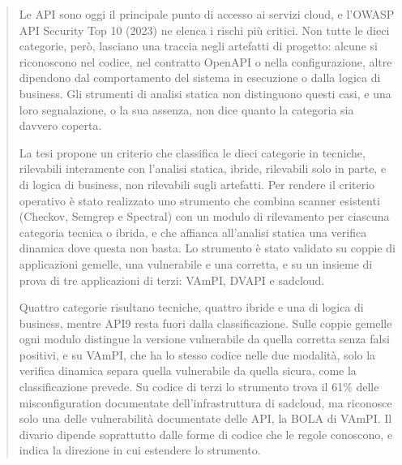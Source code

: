
\begin{titlepage}
\begin{abstract}
%
Le API sono oggi il principale punto di accesso ai servizi cloud, e l'OWASP API
Security Top 10 (2023) ne elenca i rischi più critici. Non tutte le dieci
categorie, però, lasciano una traccia negli artefatti di progetto: alcune si
riconoscono nel codice, nel contratto OpenAPI o nella configurazione, altre
dipendono dal comportamento del sistema in esecuzione o dalla logica di business.
Gli strumenti di analisi statica non distinguono questi casi, e una loro
segnalazione, o la sua assenza, non dice quanto la categoria sia davvero
coperta.

La tesi propone un criterio che classifica le dieci categorie in tecniche,
rilevabili interamente con l'analisi statica, ibride, rilevabili solo in parte,
e di logica di business, non rilevabili sugli artefatti. Per rendere il criterio
operativo è stato realizzato uno strumento che combina scanner esistenti
(Checkov, Semgrep e Spectral) con un modulo di rilevamento per ciascuna categoria
tecnica o ibrida, e che affianca all'analisi statica una verifica dinamica dove
questa non basta. Lo strumento è stato validato su coppie di applicazioni
gemelle, una vulnerabile e una corretta, e su un insieme di
prova di tre applicazioni di terzi: VAmPI, DVAPI e sadcloud.

Quattro categorie risultano tecniche, quattro ibride e una di logica di
business, mentre API9 resta fuori dalla classificazione. Sulle coppie gemelle
ogni modulo distingue la versione vulnerabile da quella corretta senza falsi
positivi, e su VAmPI, che ha lo stesso codice nelle due modalità, solo la
verifica dinamica separa quella vulnerabile da quella sicura, come la
classificazione prevede. Su codice di terzi lo strumento trova il 61\% delle
misconfiguration documentate dell'infrastruttura di sadcloud, ma riconosce
solo una delle vulnerabilità documentate delle API, la BOLA di VAmPI. Il divario
dipende soprattutto dalle forme di codice che le regole conoscono, e indica la
direzione in cui estendere lo strumento.
%
\\[1cm]
\end{abstract}
\end{titlepage}
